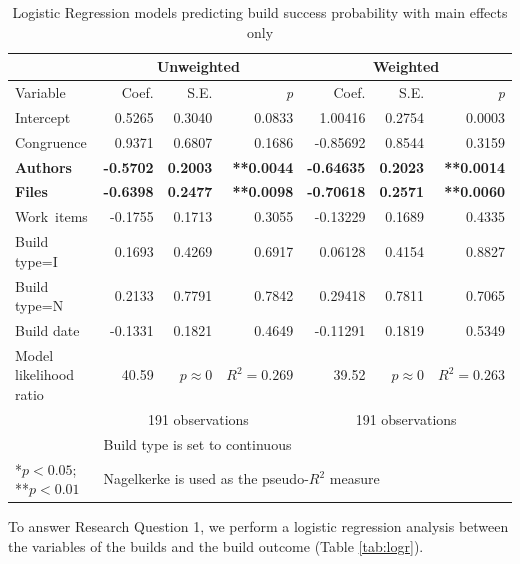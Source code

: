 \begin{table}
\begin{center}

\begin{tabular}{l|rrr|rrr}
 & \multicolumn{3}{c|}{Unweighted} & \multicolumn{3}{c}{Weighted} \\\hline
Variable & Coef. & S.E. & \emph{p} & Coef. & S.E. & \emph{p} \\
	\hline                                                                
	Intercept                &  0.5265 & 0.3040 & 0.0833 &  1.00416 & 0.2754 & 0.0003 \\
	Congruence               &  0.9371 & 0.6807 & 0.1686 & -0.85692 & 0.8544 & 0.3159 \\
	\textbf{Authors}         & \textbf{-0.5702} & \textbf{0.2003} & \textbf{**0.0044} & \textbf{-0.64635} & \textbf{0.2023} & \textbf{**0.0014} \\
	\textbf{Files}           & \textbf{-0.6398} & \textbf{0.2477} & \textbf{**0.0098} & \textbf{-0.70618} & \textbf{0.2571} & \textbf{**0.0060} \\
	Work~items                & -0.1755 & 0.1713 & 0.3055 & -0.13229 & 0.1689 & 0.4335 \\
	Build type=I                   &  0.1693 & 0.4269 & 0.6917 &  0.06128 & 0.4154 & 0.8827 \\
	Build type=N                   &  0.2133 & 0.7791 & 0.7842 &  0.29418 & 0.7811 & 0.7065 \\
	Build date               & -0.1331 & 0.1821 & 0.4649 & -0.11291 & 0.1819 & 0.5349 \\
	\hline
Model likelihood ratio & 40.59 & $p \approx 0$ & $R^2=0.269$ & 39.52 & $p \approx 0$ &	$R^2 = 0.263$ \\
& \multicolumn{3}{c}{191 observations} & \multicolumn{3}{c}{191 observations} \\
\multicolumn{1}{l}{ } & \multicolumn{6}{l}{\scriptsize{Build type is set to continuous}} \\
\multicolumn{1}{l}{\scriptsize{*$p < 0.05$; **$p < 0.01$}} & \multicolumn{6}{l}{\scriptsize{Nagelkerke is used as the pseudo-$R^2$ measure}}
\end{tabular}


\end{center}
\caption{Logistic Regression models predicting build success probability with main effects only}
\label{tab:logr_maineffects}
\end{table}

To answer Research Question 1, we perform a logistic regression analysis between the variables of the builds and the build outcome (Table \ref{tab:logr}).

